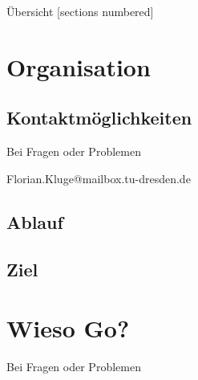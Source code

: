 

\usepackage{tikz}
\usepackage{hyperref}
\hypersetup{
	colorlinks=true,
	linkcolor=darkgray,
	urlcolor=blue,
}



\maketitle

\begin{frame}{Übersicht}
	[sections numbered]
	\tableofcontents%
\end{frame}



\section{Organisation}
\subsection{Kontaktmöglichkeiten}

\begin{frame}{Bei Fragen oder Problemen}
	\begin{center}
		Florian.Kluge@mailbox.tu-dresden.de
	\end{center}
\end{frame}


\subsection{Ablauf}
\subsection{Ziel}



\section{Wieso Go?}



\begin{frame}{Bei Fragen oder Problemen}
	
\end{frame}


